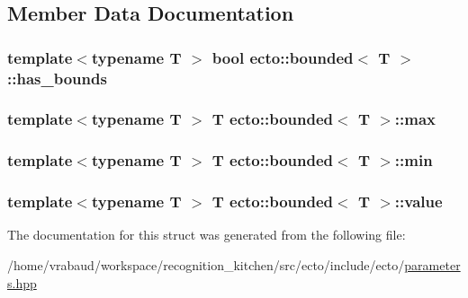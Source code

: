 \subsection{Member Data Documentation}
\hypertarget{structecto_1_1bounded_ab7ddb1af2438b94a3563f00188d02690}{}
\subsubsection[{has\+\_\+bounds}]{\setlength{\rightskip}{0pt plus 5cm}template$<$typename T $>$ bool {\bf ecto\+::bounded}$<$ T $>$\+::has\+\_\+bounds}\label{structecto_1_1bounded_ab7ddb1af2438b94a3563f00188d02690}
\hypertarget{structecto_1_1bounded_a8df1ae15c7a45a33bb17f8482c81418b}{}
\subsubsection[{max}]{\setlength{\rightskip}{0pt plus 5cm}template$<$typename T $>$ T {\bf ecto\+::bounded}$<$ T $>$\+::max}\label{structecto_1_1bounded_a8df1ae15c7a45a33bb17f8482c81418b}
\hypertarget{structecto_1_1bounded_a1809a5fa7b57a025107b0c12e6a293ae}{}
\subsubsection[{min}]{\setlength{\rightskip}{0pt plus 5cm}template$<$typename T $>$ T {\bf ecto\+::bounded}$<$ T $>$\+::min}\label{structecto_1_1bounded_a1809a5fa7b57a025107b0c12e6a293ae}
\hypertarget{structecto_1_1bounded_a92b4f90f8588d99f0d6d3216565c3f82}{}
\subsubsection[{value}]{\setlength{\rightskip}{0pt plus 5cm}template$<$typename T $>$ T {\bf ecto\+::bounded}$<$ T $>$\+::value}\label{structecto_1_1bounded_a92b4f90f8588d99f0d6d3216565c3f82}


The documentation for this struct was generated from the following file\+:\begin{DoxyCompactItemize}
\item 
/home/vrabaud/workspace/recognition\+\_\+kitchen/src/ecto/include/ecto/\hyperlink{parameters_8hpp}{parameters.\+hpp}\end{DoxyCompactItemize}
